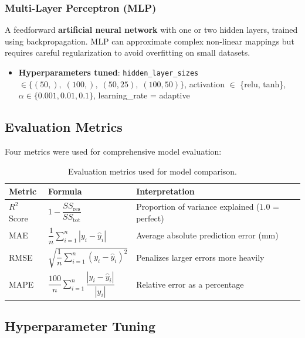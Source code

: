 \documentclass[12pt, a4paper]{article}
\begin{document}
\subsubsection{Multi-Layer Perceptron (MLP)}
\label{sec:mlp}

A feedforward \textbf{artificial neural network} with one or two hidden layers, trained using backpropagation. MLP can approximate complex non-linear mappings but requires careful regularization to avoid overfitting on small datasets.

\begin{itemize}
    \item \textbf{Hyperparameters tuned}: \texttt{hidden\_layer\_sizes} $\in \{(50,),\; (100,),\; (50, 25),\; (100, 50)\}$, activation $\in$ \{relu, tanh\}, $\alpha \in \{0.001, 0.01, 0.1\}$, learning\_rate = adaptive
\end{itemize}

\subsection{Evaluation Metrics}
\label{sec:metrics}

Four metrics were used for comprehensive model evaluation:

\begin{table}[H]
\centering
\caption{Evaluation metrics used for model comparison.}
\label{tab:metrics}
\begin{tabular}{@{}lll@{}}
\toprule
\textbf{Metric} & \textbf{Formula} & \textbf{Interpretation} \\
\midrule
$R^2$ Score & $1 - \dfrac{SS_{\text{res}}}{SS_{\text{tot}}}$ & Proportion of variance explained ($1.0$ = perfect) \\[1em]
MAE & $\dfrac{1}{n}\displaystyle\sum_{i=1}^{n}|y_i - \hat{y}_i|$ & Average absolute prediction error (mm) \\[1em]
RMSE & $\sqrt{\dfrac{1}{n}\displaystyle\sum_{i=1}^{n}(y_i - \hat{y}_i)^2}$ & Penalizes larger errors more heavily \\[1em]
MAPE & $\dfrac{100}{n}\displaystyle\sum_{i=1}^{n}\dfrac{|y_i - \hat{y}_i|}{|y_i|}$ & Relative error as a percentage \\
\bottomrule
\end{tabular}
\end{table}

\subsection{Hyperparameter Tuning}
\label{sec:tuning}
\end{document}
